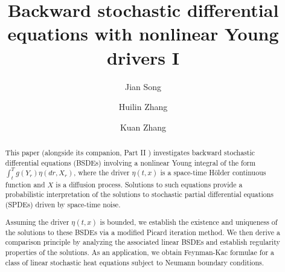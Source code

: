 \documentclass[11pt,reqno]{amsart}
\numberwithin{equation}{section}
\begin{document}
\author{}
\date{}
\title[BSDEs with nonlinear Young drivers]{Backward stochastic differential equations with nonlinear Young drivers I}


\author[J. Song]{Jian Song}\address{Research Center for Mathematics and Interdisciplinary Sciences, Frontiers Science Center for Nonlinear Expectations (Ministry of Education), State Key Laboratory of Cryptography and Digital Economy Security, Shandong University, Qingdao, 266237, China}

\author[H. Zhang]{Huilin Zhang}\address{Research Center for Mathematics and Interdisciplinary Sciences, Frontiers Science Center for Nonlinear Expectations (Ministry of Education), Shandong University, Qingdao 266237, China; Department of Mathematics, Humboldt University, Berlin 10099, Germany}

\author[K. Zhang]{Kuan Zhang}\address{Research Center for Mathematics and Interdisciplinary Sciences, Shandong University, Qingdao 266237, China}


\begin{abstract}
This paper (alongside its companion, Part II \cite{BSDEYoung-II}) investigates backward stochastic differential equations (BSDEs) involving a nonlinear Young integral of the form $\int_{t}^{T}g(Y_{r})\eta(dr,X_{r})$, where the driver $\eta(t,x)$ is a space-time H\"older continuous function and $X$ is a diffusion process. Solutions to such equations provide a probabilistic interpretation of the solutions to stochastic partial differential equations (SPDEs) driven by space-time noise. 

Assuming the driver $\eta(t,x)$ is bounded, we establish the existence and uniqueness of the solutions to these BSDEs via a modified Picard iteration method. We then derive a comparison principle by analyzing the associated linear BSDEs and establish regularity properties of the solutions. As an application, we obtain Feynman-Kac formulae for a class of linear stochastic heat equations subject to Neumann boundary conditions. 


\end{abstract}

\maketitle
\tableofcontents
\end{document}

